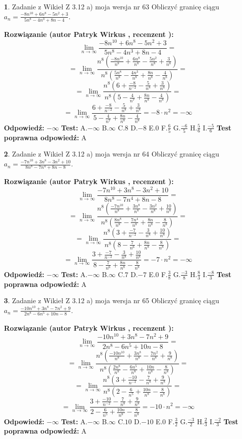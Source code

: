 \documentclass[12pt, a4paper]{article}
\theoremstyle{definition} %
\newtheorem{zad}{}
\newcommand{\zadStart}[1]{\begin{zad}#1\newline}
\newcommand{\zadStop}{\end{zad}}
\newcommand{\rozwStart}[2]{\noindent \textbf{Rozwiązanie (autor #1 , recenzent #2): }\newline}
\newcommand{\rozwStop}{\newline}
\newcommand{\odpStart}{\noindent \textbf{Odpowiedź:}\newline}
\newcommand{\odpStop}{\newline}
\newcommand{\testStart}{\noindent \textbf{Test:}\newline}
\newcommand{\testStop}{\newline}
\newcommand{\kluczStart}{\noindent \textbf{Test poprawna odpowiedź:}\newline}
\newcommand{\kluczStop}{\newline}
\begin{document}
\zadStart{Zadanie z Wikieł Z 3.12 a) moja wersja nr 63}
Obliczyć granicę ciągu $a_{n}=\frac{-8n^{10}+6n^{8}-5n^{2}+3}{5n^{8}-4n^{3}+8n-4}$.
\zadStop
\rozwStart{Patryk Wirkus}{}
$$\lim\limits_{n\to\infty}\frac{-8n^{10}+6n^{8}-5n^{2}+3}{5n^{8}-4n^{3}+8n-4}=$$
$$=\lim\limits_{n\to\infty}\frac{n^{8}\left(\frac{-8n^{10}}{n^{8}}+\frac{6n^{8}}{n^{8}}-\frac{5n^{2}}{n^{8}}+\frac{3}{n^{8}}\right)}{n^{8}\left(\frac{5n^{8}}{n^{8}}-\frac{4n^{3}}{n^{8}}+\frac{8n}{n^{8}}-\frac{4}{n^{8}}\right)}=$$
$$=\lim\limits_{n\to\infty}\frac{n^{8}\left(6+\frac{-8}{n^{-2}}-\frac{5}{n^{8}}+\frac{3}{n^{8}}\right)}
{n^{8}\left(5-\frac{4}{n^{7}}+\frac{8n}{n^{8}}-\frac{4}{n^{8}}\right)}=$$
$$=\lim\limits_{n\to\infty}\frac{6+\frac{-8}{n^{-2}}-\frac{5}{n^{8}}+\frac{3}{n^{8}}}{5-\frac{4}{n^{7}}+\frac{8n}{n^{8}}-\frac{4}{n^{8}}}=-8\cdot n^{2} = -\infty$$
\rozwStop
\odpStart
$-\infty$
\odpStop
\testStart
A.$-\infty$
B.$\infty$
C.$8$
D.$-8$
E.$0$
F.$\frac{6}{5}$
G.$\frac{-6}{5}$
H.$\frac{5}{6}$
I.$\frac{-5}{6}$
\testStop
\kluczStart
A
\kluczStop



\zadStart{Zadanie z Wikieł Z 3.12 a) moja wersja nr 64}
Obliczyć granicę ciągu $a_{n}=\frac{-7n^{10}+3n^{8}-3n^{2}+10}{8n^{8}-7n^{4}+8n-8}$.
\zadStop
\rozwStart{Patryk Wirkus}{}
$$\lim\limits_{n\to\infty}\frac{-7n^{10}+3n^{8}-3n^{2}+10}{8n^{8}-7n^{4}+8n-8}=$$
$$=\lim\limits_{n\to\infty}\frac{n^{8}\left(\frac{-7n^{10}}{n^{8}}+\frac{3n^{8}}{n^{8}}-\frac{3n^{2}}{n^{8}}+\frac{10}{n^{8}}\right)}{n^{8}\left(\frac{8n^{8}}{n^{8}}-\frac{7n^{4}}{n^{8}}+\frac{8n}{n^{8}}-\frac{8}{n^{8}}\right)}=$$
$$=\lim\limits_{n\to\infty}\frac{n^{8}\left(3+\frac{-7}{n^{-2}}-\frac{3}{n^{8}}+\frac{10}{n^{8}}\right)}
{n^{8}\left(8-\frac{7}{n^{6}}+\frac{8n}{n^{8}}-\frac{8}{n^{8}}\right)}=$$
$$=\lim\limits_{n\to\infty}\frac{3+\frac{-7}{n^{-2}}-\frac{3}{n^{8}}+\frac{10}{n^{8}}}{8-\frac{7}{n^{6}}+\frac{8n}{n^{8}}-\frac{8}{n^{8}}}=-7\cdot n^{2} = -\infty$$
\rozwStop
\odpStart
$-\infty$
\odpStop
\testStart
A.$-\infty$
B.$\infty$
C.$7$
D.$-7$
E.$0$
F.$\frac{3}{8}$
G.$\frac{-3}{8}$
H.$\frac{8}{3}$
I.$\frac{-8}{3}$
\testStop
\kluczStart
A
\kluczStop



\zadStart{Zadanie z Wikieł Z 3.12 a) moja wersja nr 65}
Obliczyć granicę ciągu $a_{n}=\frac{-10n^{10}+3n^{8}-7n^{2}+9}{2n^{8}-6n^{5}+10n-8}$.
\zadStop
\rozwStart{Patryk Wirkus}{}
$$\lim\limits_{n\to\infty}\frac{-10n^{10}+3n^{8}-7n^{2}+9}{2n^{8}-6n^{5}+10n-8}=$$
$$=\lim\limits_{n\to\infty}\frac{n^{8}\left(\frac{-10n^{10}}{n^{8}}+\frac{3n^{8}}{n^{8}}-\frac{7n^{2}}{n^{8}}+\frac{9}{n^{8}}\right)}{n^{8}\left(\frac{2n^{8}}{n^{8}}-\frac{6n^{5}}{n^{8}}+\frac{10n}{n^{8}}-\frac{8}{n^{8}}\right)}=$$
$$=\lim\limits_{n\to\infty}\frac{n^{8}\left(3+\frac{-10}{n^{-2}}-\frac{7}{n^{8}}+\frac{9}{n^{8}}\right)}
{n^{8}\left(2-\frac{6}{n^{5}}+\frac{10n}{n^{8}}-\frac{8}{n^{8}}\right)}=$$
$$=\lim\limits_{n\to\infty}\frac{3+\frac{-10}{n^{-2}}-\frac{7}{n^{8}}+\frac{9}{n^{8}}}{2-\frac{6}{n^{5}}+\frac{10n}{n^{8}}-\frac{8}{n^{8}}}=-10\cdot n^{2} = -\infty$$
\rozwStop
\odpStart
$-\infty$
\odpStop
\testStart
A.$-\infty$
B.$\infty$
C.$10$
D.$-10$
E.$0$
F.$\frac{3}{2}$
G.$\frac{-3}{2}$
H.$\frac{2}{3}$
I.$\frac{-2}{3}$
\testStop
\kluczStart
A
\kluczStop
\end{document}
